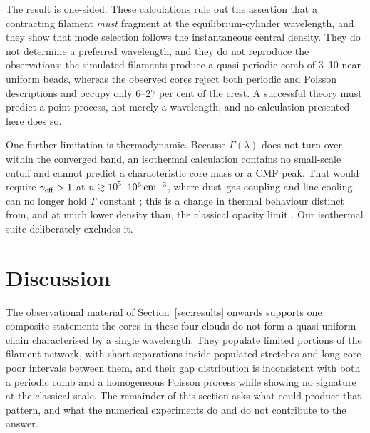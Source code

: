 \documentclass[usenatbib,twoside,twocolumn]{mnras}
\begin{document}
The result is one-sided. These calculations rule out the assertion that a contracting filament \emph{must} fragment at the equilibrium-cylinder wavelength, and they show that mode selection follows the instantaneous central density. They do not determine a preferred wavelength, and they do not reproduce the observations: the simulated filaments produce a quasi-periodic comb of 3--10 near-uniform beads, whereas the observed cores reject both periodic and Poisson descriptions and occupy only $6$--$27$ per cent of the crest. A successful theory must predict a point process, not merely a wavelength, and no calculation presented here does so.

One further limitation is thermodynamic. Because $\Gamma(\lambda)$ does not turn over within the converged band, an isothermal calculation contains no small-scale cutoff and cannot predict a characteristic core mass or a CMF peak. That would require $\gamma_{\rm eff}>1$ at $n\gtrsim10^{5}$--$10^{6}\,{\rm cm^{-3}}$, where dust--gas coupling and line cooling can no longer hold $T$ constant \citep{Larson1985,Glover2012}; this is a change in thermal behaviour distinct from, and at much lower density than, the classical opacity limit \citep{Rees1976,LowLyndenBell1976}. Our isothermal suite deliberately excludes it.

\section{Discussion}

\noindent The observational material of Section~\ref{sec:results} onwards supports one composite statement: the cores in these four clouds do not form a quasi-uniform chain characterised by a single wavelength. They populate limited portions of the filament network, with short separations inside populated stretches and long core-poor intervals between them, and their gap distribution is inconsistent with both a periodic comb and a homogeneous Poisson process while showing no signature at the classical scale. The remainder of this section asks what could produce that pattern, and what the numerical experiments do and do not contribute to the answer.
\label{sec:discussion}
\end{document}
